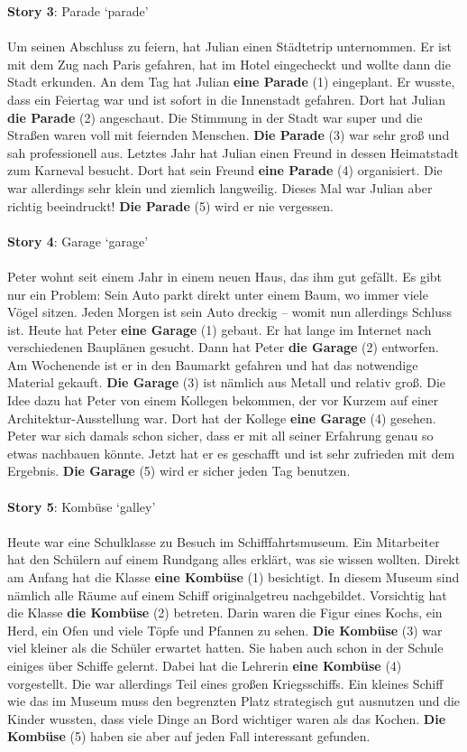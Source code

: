 \textbf{Story 3}: Parade `parade'\\
\\
Um seinen Abschluss zu feiern, hat Julian einen Städtetrip unternommen. Er ist mit dem Zug nach Paris gefahren, hat im Hotel eingecheckt und wollte dann die Stadt erkunden. An dem Tag hat Julian \textbf{eine Parade} (1) eingeplant. Er wusste, dass ein Feiertag war und ist sofort in die Innenstadt gefahren. Dort hat Julian \textbf{die Parade} (2) angeschaut. Die Stimmung in der Stadt war super und die Straßen waren voll mit feiernden Menschen. \textbf{Die Parade} (3) war sehr groß und sah professionell aus. Letztes Jahr hat Julian einen Freund in dessen Heimatstadt zum Karneval besucht. Dort hat sein Freund \textbf{eine Parade} (4) organisiert. Die war allerdings sehr klein und ziemlich langweilig. Dieses Mal war Julian aber richtig beeindruckt! \textbf{Die Parade} (5) wird er nie vergessen.\\
\\
\textbf{Story 4}: Garage `garage'\\
\\
Peter wohnt seit einem Jahr in einem neuen Haus, das ihm gut gefällt. Es gibt nur ein Problem: Sein Auto parkt direkt unter einem Baum, wo immer viele Vögel sitzen. Jeden Morgen ist sein Auto dreckig – womit nun allerdings Schluss ist. Heute hat Peter \textbf{eine Garage} (1) gebaut. Er hat lange im Internet nach verschiedenen Bauplänen gesucht. Dann hat Peter \textbf{die Garage} (2) entworfen. Am Wochenende ist er in den Baumarkt gefahren und hat das notwendige Material gekauft. \textbf{Die Garage} (3) ist nämlich aus Metall und relativ groß. Die Idee dazu hat Peter von einem Kollegen bekommen, der vor Kurzem auf einer Architektur-Ausstellung war. Dort hat der Kollege \textbf{eine Garage} (4) gesehen. Peter war sich damals schon sicher, dass er mit all seiner Erfahrung genau so etwas nachbauen könnte. Jetzt hat er es geschafft und ist sehr zufrieden mit dem Ergebnis. \textbf{Die Garage} (5) wird er sicher jeden Tag benutzen.\\
\\
\textbf{Story 5}: Kombüse `galley'\\
\\
Heute war eine Schulklasse zu Besuch im Schifffahrtsmuseum. Ein Mitarbeiter hat den Schülern auf einem Rundgang alles erklärt, was sie wissen wollten. Direkt am Anfang hat die Klasse \textbf{eine Kombüse} (1) besichtigt. In diesem Museum sind nämlich alle Räume auf einem Schiff originalgetreu nachgebildet. Vorsichtig hat die Klasse \textbf{die Kombüse} (2) betreten. Darin waren die Figur eines Kochs, ein Herd, ein Ofen und viele Töpfe und Pfannen zu sehen. \textbf{Die Kombüse} (3) war viel kleiner als die Schüler erwartet hatten. Sie haben auch schon in der Schule einiges über Schiffe gelernt. Dabei hat die Lehrerin \textbf{eine Kombüse} (4) vorgestellt. Die war allerdings Teil eines großen Kriegsschiffs. Ein kleines Schiff wie das im Museum muss den begrenzten Platz strategisch gut ausnutzen und die Kinder wussten, dass viele Dinge an Bord wichtiger waren als das Kochen. \textbf{Die Kombüse} (5) haben sie aber auf jeden Fall interessant gefunden.\\

